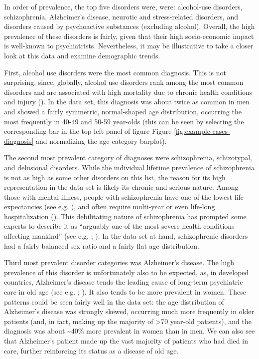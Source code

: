 \documentclass[
  openany]{book}
\theoremstyle{definition}
\theoremstyle{definition}
\theoremstyle{definition}
\theoremstyle{definition}
\theoremstyle{remark}
\begin{document}
In order of prevalence, the top five disorders were, were: alcohol-use disorders, schizophrenia, Alzheimer's disease, neurotic and stress-related disorders, and disorders caused by psychoactive substances (excluding alcohol). Overall, the high prevalence of these disorders is fairly, given that their high socio-economic impact is well-known to psychiatrists. Nevertheless, it may be illustrative to take a closer look at this data and examine demographic trends.

First, alcohol use disorders were the most common diagnosis. This is not surprising, since, globally, alcohol use disorders rank among the most common disorders and are associated with high mortality due to chronic health conditions and injury (). In the data set, this diagnosis was about twice as common in men and showed a fairly symmetric, normal-shaped age distribution, occurring the most frequently in 40-49 and 50-59 year-olds (this can be seen by selecting the corresponding bar in the top-left panel of figure Figure \ref{fig:example-cases-diagnosis} and normalizing the age-category barplot).

The second most prevalent category of diagnoses were schizophrenia, schizotypal, and delusional disorders. While the individual lifetime prevalence of schizophrenia is not as high as some other disorders on this list, the reason for its high representation in the data set is likely its chronic and serious nature. Among those with mental illness, people with schizophrenia have one of the lowest life expectancies (see e.g. ), and often require multi-year or even life-long hospitalization (). This debilitating nature of schizophrenia has prompted some experts to describe it as ``arguably one of the most severe health conditions affecting mankind'' (see e.g. ; ). In the data set at hand, schizophrenic disorders had a fairly balanced sex ratio and a fairly flat age distribution.

Third most prevalent disorder categories was Alzheimer's disease. The high prevalence of this disorder is unfortunately also to be expected, as, in developed countries, Alzheimer's disease tends the leading cause of long-term psychiatric care in old age (see e.g. ; ). It also tends to be more prevalent in women. These patterns could be seen fairly well in the data set: the age distribution of Alzheimer's disease was strongly skewed, occurring much more frequently in older patients (and, in fact, making up the majority of \textgreater70 year-old patients), and the diagnosis was about \textasciitilde40\% more prevalent in women than in men. We can also see that Alzheimer's patient made up the vast majority of patients who had died in care, further reinforcing its status as a disease of old age.
\end{document}
